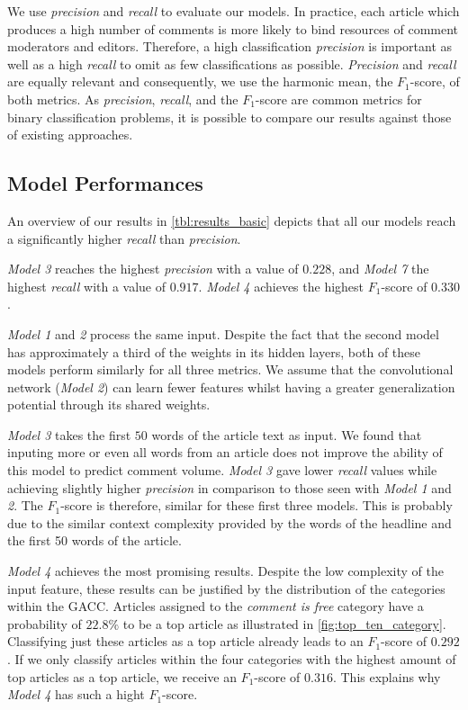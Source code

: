 We use \textit{precision} and \textit{recall} to evaluate our models. 
In practice, each article which produces a high number of comments is more likely to bind resources of comment moderators and editors.
Therefore, a high classification \textit{precision} is important as well as a high \textit{recall} to omit as few classifications as possible.
\textit{Precision} and \textit{recall} are equally relevant and consequently, we use the harmonic mean, the $F_1$-score, of both metrics. As \textit{precision}, \textit{recall}, and the $F_1$-score are common metrics for binary classification problems, it is possible to compare our results against those of existing approaches.

\subsection{Model Performances}
An overview of our results in \autoref{tbl:results_basic} depicts that all our models reach a significantly higher \textit{recall} than \textit{precision}.

\textit{Model 3} reaches the highest \textit{precision} with a value of $0.228$, and \textit{Model 7} the highest \textit{recall} with a value of $0.917$. \textit{Model 4} achieves the highest $F_1$-score of $0.330$. 



\textit{Model 1} and \textit{2} process the same input. Despite the fact that the second model has approximately a third of the weights in its hidden layers, both of these models perform similarly for all three metrics.
We assume that the convolutional network (\textit{Model 2}) can learn fewer features whilst having a greater generalization potential through its shared weights.

\textit{Model 3} takes the first $50$ words of the article text as input. 
We found that inputing more or even all words from an article does not improve the ability of this model to predict comment volume.
\textit{Model 3} gave lower \textit{recall} values while achieving slightly higher \textit{precision} in comparison to those seen with \textit{Model 1} and \textit{2}. 
The $F_1$-score is therefore, similar for these first three models.
This is probably due to the similar context complexity provided by the words of the headline and the first 50 words of the article.

\textit{Model 4} achieves the most promising results. 
Despite the low complexity of the input feature, these results can be justified by the distribution of the categories within the GACC. 
Articles assigned to the \textit{comment is free} category have a probability of $22.8\%$ to be a top article as illustrated in \autoref{fig:top_ten_category}. 
Classifying just these articles as a top article already leads to an $F_1$-score of $0.292$.
If we only classify articles within the four categories with the highest amount of top articles as a top article, we receive an $F_1$-score of $0.316$. 
This explains why \textit{Model 4} has such a hight $F_1$-score.

